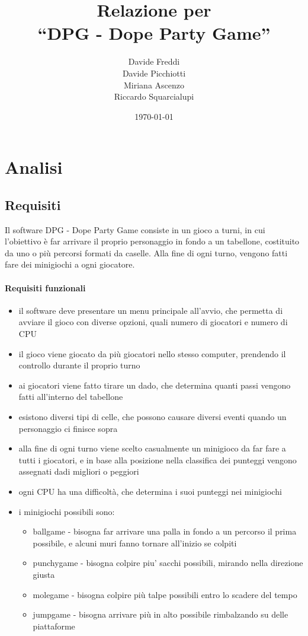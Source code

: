 \documentclass[a4paper,12pt]{report}
\title{Relazione per\\``DPG - Dope Party Game''}
\author{Davide Freddi\\Davide Picchiotti\\Miriana Ascenzo\\Riccardo Squarcialupi}
\date{\today}
\begin{document}
 
\maketitle

\tableofcontents

\chapter{Analisi}
\section{Requisiti}
Il software DPG - Dope Party Game consiste in un gioco a turni, in cui l'obiettivo è far arrivare il proprio personaggio in fondo a un tabellone, costituito da uno o più percorsi formati da caselle.
%
Alla fine di ogni turno, vengono fatti fare dei minigiochi a ogni giocatore.

\subsubsection{Requisiti funzionali}
\begin{itemize}
	\item il software deve presentare un menu principale all'avvio, che permetta di avviare il gioco con diverse opzioni, quali numero di giocatori e numero di CPU
	\item il gioco viene giocato da più giocatori nello stesso computer, prendendo il controllo durante il proprio turno
	\item ai giocatori viene fatto tirare un dado, che determina quanti passi vengono fatti all'interno del tabellone
	\item esistono diversi tipi di celle, che possono causare diversi eventi quando un personaggio ci finisce sopra
	\item alla fine di ogni turno viene scelto casualmente un minigioco da far fare a tutti i giocatori, e in base alla posizione nella classifica dei punteggi vengono assegnati dadi migliori o peggiori
	\item ogni CPU ha una difficoltà, che determina i suoi punteggi nei minigiochi
	\item i minigiochi possibili sono:
	\begin{itemize}
	    \item ballgame - bisogna far arrivare una palla in fondo a un percorso il prima possibile, e alcuni muri fanno tornare all'inizio se colpiti
	    \item punchygame - bisogna colpire piu' sacchi possibili, mirando nella direzione giusta
	    \item molegame - bisogna colpire più talpe possibili entro lo scadere del tempo
	    \item jumpgame - bisogna arrivare più in alto possibile rimbalzando su delle piattaforme
	\end{itemize}
\end{itemize}
\end{document}
